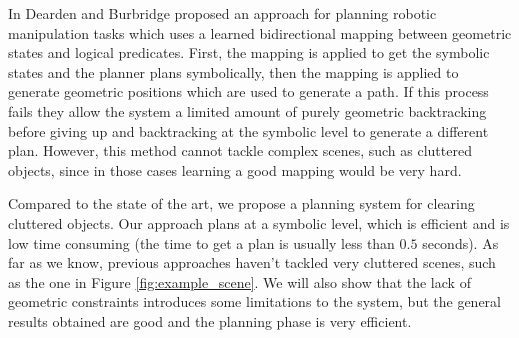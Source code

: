 In \citep{Dearden2014355} Dearden and Burbridge proposed an approach for planning robotic manipulation tasks which uses a learned bidirectional mapping between geometric states and logical predicates. First, the mapping is applied to get the symbolic states and the planner plans symbolically, then the mapping is applied to generate geometric positions which are used to generate a path. If this process
fails they allow the system a limited amount of purely geometric backtracking before giving up and backtracking at the symbolic level to generate a different plan. However, this method cannot tackle complex scenes, such as cluttered objects, since in those cases learning a good mapping would be very hard.   

Compared to the state of the art, we propose a planning system for clearing cluttered objects. Our approach plans at a symbolic level, which is efficient and is low time consuming  (the time to get a plan is usually less than $0.5$ seconds). As far as we know, previous approaches haven't tackled very cluttered scenes, such as the one in Figure \ref{fig:example_scene}. We will also show that the lack of geometric constraints introduces some limitations to the system, but the general results obtained are good and the planning phase is very efficient.  


